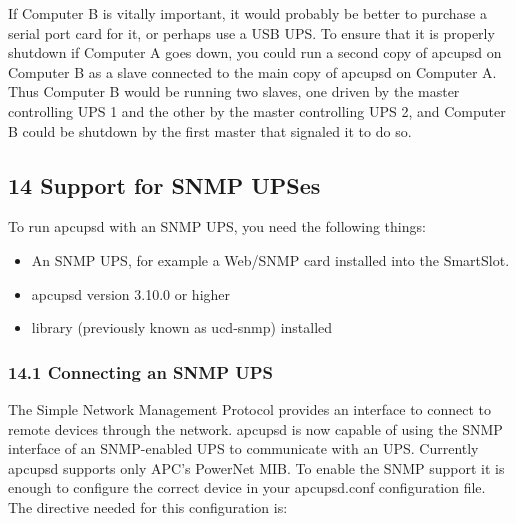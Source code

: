 {{{{{{{{{{If Computer B is vitally important, it would probably be better to purchase a
serial port card for it, or perhaps use a USB UPS. To ensure that it is
properly shutdown if Computer A goes down, you could run a second copy of
apcupsd on Computer B as a slave connected to the main copy of apcupsd on
Computer A. Thus Computer B would be running two slaves, one driven by the
master controlling UPS 1 and the other by the master controlling UPS 2, and
Computer B could be shutdown by the first master that signaled it to do so. 

\label{Support-for-SNMP-UPSes}

\subsection*{14 Support for SNMP UPSes}

\label{index-SNMP-162}
 To run apcupsd with an SNMP UPS, you need the
following things:  

\begin{itemize}
\item An SNMP UPS, for example a Web/SNMP card installed into the SmartSlot.  
\item apcupsd version 3.10.0 or higher  
\item 
{} library (previously known as
ucd-snmp) installed 
\end{itemize}

\label{Connecting-an-SNMP-UPS}

\subsubsection*{14.1 Connecting an SNMP UPS}

\label{index-SNMP_002c-Connecting-163}
The Simple Network Management Protocol provides an interface to connect to
remote devices through the network. apcupsd is now capable of using the SNMP
interface of an SNMP-enabled UPS to communicate with an UPS. Currently apcupsd
supports only APC's PowerNet MIB. To enable the SNMP support it is enough to
configure the correct device in your apcupsd.conf configuration file. The
directive needed for this configuration is: 

}}}}}}}}}}
